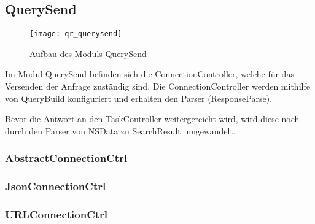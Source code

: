 
\subsection{QuerySend}

\begin{figure}[htb]
  	\texttt{[image: qr\_querysend]}
  	\caption{Aufbau des Moduls QuerySend}
	\label{fig:Aufbau des Moduls QuerySend}
\end{figure}

Im Modul QuerySend befinden sich die ConnectionController, welche für das Versenden der Anfrage zuständig sind. Die ConnectionController werden mithilfe von QueryBuild konfiguriert und erhalten den Parser (ResponseParse).

Bevor die Antwort an den TaskController weitergereicht wird, wird diese noch durch den Parser von NSData zu SearchResult umgewandelt.

\subsubsection{AbstractConnectionCtrl}
\subsubsection{JsonConnectionCtrl}
\subsubsection{URLConnectionCtrl}


